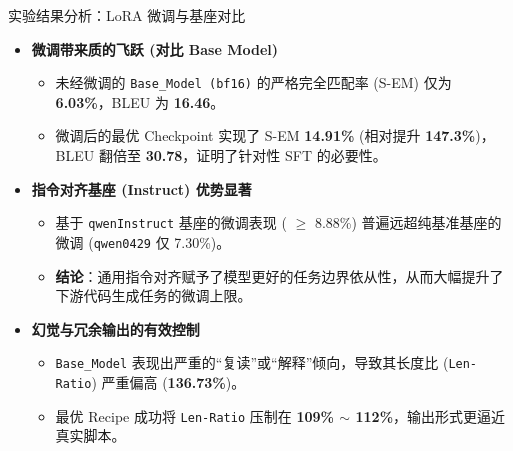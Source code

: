 \documentclass[aspectratio=169]{beamer}
\begin{document}
\begin{frame}{实验结果分析：LoRA 微调与基座对比}
    \begin{itemize}
        \item \textbf{微调带来质的飞跃 (对比 Base Model)}
        \begin{itemize}
            \item 未经微调的 \texttt{Base\_Model (bf16)} 的严格完全匹配率 (S-EM) 仅为 \textbf{6.03\%}，BLEU 为 \textbf{16.46}。
            \item 微调后的最优 Checkpoint 实现了 S-EM \textbf{14.91\%} (相对提升 \textbf{147.3\%})，BLEU 翻倍至 \textbf{30.78}，证明了针对性 SFT 的必要性。
        \end{itemize}
        
        \vspace{0.2cm}
        \item \textbf{指令对齐基座 (Instruct) 优势显著}
        \begin{itemize}
            \item 基于 \texttt{qwenInstruct} 基座的微调表现 ( $\ge$ 8.88\%) 普遍远超纯基准基座的微调 (\texttt{qwen0429} 仅 7.30\%)。
            \item \textbf{结论}：通用指令对齐赋予了模型更好的任务边界依从性，从而大幅提升了下游代码生成任务的微调上限。
        \end{itemize}
        
        \vspace{0.2cm}
        \item \textbf{幻觉与冗余输出的有效控制}
        \begin{itemize}
            \item \texttt{Base\_Model} 表现出严重的“复读”或“解释”倾向，导致其长度比 (\texttt{Len-Ratio}) 严重偏高 (\textbf{136.73\%})。
            \item 最优 Recipe 成功将 \texttt{Len-Ratio} 压制在 \textbf{109\% $\sim$ 112\%}，输出形式更逼近真实脚本。
        \end{itemize}
    \end{itemize}
\end{frame}
\end{document}
